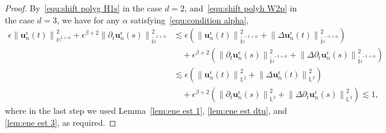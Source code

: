 \documentclass[11pt,reqno]{amsart}
\theoremstyle{definition}
\numberwithin{equation}{section}
\newcommand{\bff}{\boldsymbol}
\newcommand{\bb}{\mathbb}
\newcommand{\pa}{\partial}
\newcommand{\norm}[2]{\left\|{#1}\right\|_{#2}}
\begin{document}
\begin{proof}
By~\eqref{equ:shift polyg H1s} in the case $d=2$, and~\eqref{equ:shift polyh W2p} in the case $d=3$, we have for any $\alpha$ satisfying~\eqref{equ:condition alpha},
\begin{align*}
	\epsilon \norm{\bff{u}_n^\epsilon(t)}{\bb{H}^{1+\alpha}}^2
	+
	\epsilon^{\beta+2} 
	\norm{\pa_t\bff{u}_n^\epsilon(s)}{\widetilde{\bb{H}}^{1+\alpha}}^2 
	&\lesssim 
	\epsilon \left(\norm{\bff{u}_n^\epsilon(t)}{\widetilde{\bb{H}}^{-1+\alpha}}^2
	+
	\norm{\Delta \bff{u}_n^\epsilon(t)}{\widetilde{\bb{H}}^{-1+\alpha}}^2 \right)
	\\
	&\quad
	+
	\epsilon^{\beta+2} \left(
	\norm{\pa_t\bff{u}_n^\epsilon(s)}{\widetilde{\bb{H}}^{-1+\alpha}}^2 +
	\norm{\Delta \pa_t\bff{u}_n^\epsilon(s)}{\widetilde{\bb{H}}^{-1+\alpha}}^2 \right)
	\\
	&\lesssim
	\epsilon\left(\norm{\bff{u}_n^\epsilon(t)}{\bb{L}^2}^2
	+
	\norm{\Delta \bff{u}_n^\epsilon(t)}{\bb{L}^2}^2 \right)
	\\
	&\quad
	+
	\epsilon^{\beta+2} 
	\left(\norm{\pa_t\bff{u}_n^\epsilon(s)}{\bb{L}^2}^2 +
	\norm{\Delta \pa_t\bff{u}_n^\epsilon(s)}{\bb{L}^2}^2 \right) 
	\lesssim 1,
\end{align*}
where in the last step we used Lemma~\ref{lem:ene est 1}, \ref{lem:ene est dtu}, and \ref{lem:ene est 3}, as required.
\end{proof}
\end{document}
